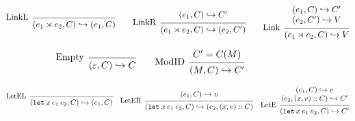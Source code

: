 \documentclass[acmsmall,screen,review]{acmart}\settopmatter{printfolios=true,printccs=false,printacmref=false}
\newcommand*{\cons}{::}
\newcommand*{\semarrow}{\hookrightarrow}
\newcommand*{\link}[2]{{#1}\rtimes{#2}}
\begin{document}
\begin{figure}[h!]
  \[
    \begin{prooftree}
      \infer[left label=LinkL]0{
      (\link{e_{1}}{e_{2}}, C)
      \semarrow
      (e_{1}, C)
      }
    \end{prooftree}\qquad
    \begin{prooftree}
      \hypo{
        \begin{matrix}
          (e_{1}, C)
          \semarrow
          C'
        \end{matrix}
      }
      \infer[left label=LinkR]1{
      (\link{e_{1}}{e_{2}}, C)
      \semarrow
      (e_{2}, C')
      }
    \end{prooftree}\qquad
    \begin{prooftree}
      \hypo{
        \begin{matrix}
          (e_{1}, C)
          \semarrow
          C' \\
          (e_{2}, C')
          \semarrow
          V
        \end{matrix}
      }
      \infer[left label=Link]1{
      (\link{e_{1}}{e_{2}}, C)
      \semarrow
      V
      }
    \end{prooftree}
  \]

  \[
    \begin{prooftree}
      \infer[left label=Empty]0{
      (\varepsilon, C)
      \semarrow
      C
      }
    \end{prooftree}\qquad
    \begin{prooftree}
      \hypo{C'=C(M)}
      \infer[left label=ModID]1{
      (M, C)
      \semarrow
      C'
      }
    \end{prooftree}
  \]

  \[
    \begin{prooftree}
      \infer[left label=LetEL]0{
      (\mathtt{let}\:x\:e_1\:e_2, C)
      \semarrow
      (e_{1}, C)
      }
    \end{prooftree}\quad
    \begin{prooftree}
      \hypo{
        \begin{matrix}
          (e_{1}, C)
          \semarrow
          v
        \end{matrix}
      }
      \infer[left label=LetER]1{
      (\mathtt{let}\:x\:e_1\:e_2, C)
      \semarrow
      (e_{2}, (x, v)\cons C)
      }
    \end{prooftree}\quad
    \begin{prooftree}
      \hypo{
        \begin{matrix}
          (e_{1}, C)
          \semarrow
          v \\
          (e_{2}, (x, v)\cons C)
          \semarrow
          C'
        \end{matrix}
      }
      \infer[left label=LetE]1{
      (\mathtt{let}\:x\:e_1\:e_2, C)
      \semarrow
      C'
      }
    \end{prooftree}
  \]


\end{figure}
\end{document}
